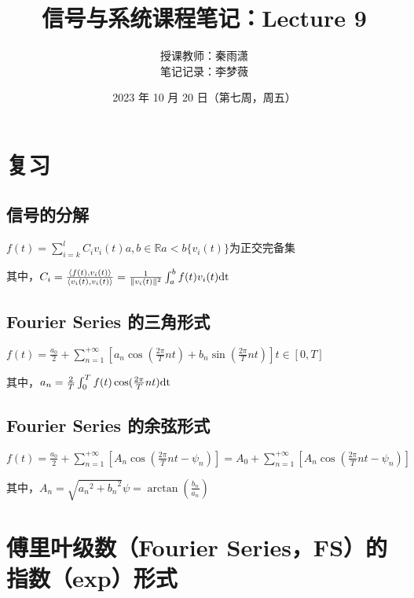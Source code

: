 \documentclass[UTF8]{ctexart}
\begin{document}
\title{信号与系统课程笔记：Lecture 9}
\author{授课教师：秦雨潇 \\
        笔记记录：李梦薇}
\date{2023 年 10 月 20 日（第七周，周五）}
\maketitle

\section{复习}

\subsection{信号的分解}
$f(t)=\sum_{i=k}^{l}C_iv_i(t)$\quad$a,b\in\mathbb{R}$\quad$a<b$\quad$\{v_i(t)\}$为正交完备集 \par
其中，$C_i=\frac{\langle{f(t),v_i(t)}\rangle}{\langle{v_i(t),v_i(t)}\rangle}
=\frac{1}{\|v_i(t)\Vert^2}\int_{a}^{b}f(t)v_i(t){\rm{dt}}$ \par

\subsection{Fourier Series 的三角形式}
$f(t)=\frac{a_0}{2}+\sum_{n=1}^{+\infty}[a_n\cos(\frac{2\pi}{T}nt)+b_n\sin(\frac{2\pi}{T}nt)]$\quad$t\in[0,T]$ \par
其中，$a_n=\frac{2}{T}\int_{0}^{T}f(t)\cos(\frac{2\pi}{T}nt){\rm{dt}}$

\subsection{Fourier Series 的余弦形式}
$f(t)=\frac{a_0}{2}+\sum_{n=1}^{+\infty}[A_n\cos(\frac{2\pi}{T}nt-\psi_n)]=A_0+\sum_{n=1}^{+\infty}[A_n\cos(\frac{2\pi}{T}nt-\psi_n)]$ \par
其中，$A_n=\sqrt{{a_n}^2+{b_n}^2}$\quad$\psi=\arctan(\frac{b_n}{a_n})$

\section{傅里叶级数（Fourier Series，FS）的指数（exp）形式}
\end{document}
